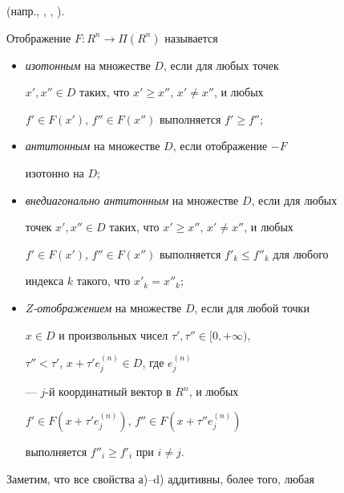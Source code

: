 (напр., \cite{PS82}, \cite{Opo86}, \cite{Isa92}).











\begin{defns} \label{def:1}


Отображение $F: R^n \to \Pi (R^n)$ называется


\begin{itemize}


\item[а)] {\it изотонным} на множестве $D$, если для любых точек


$x',x'' \in D$ таких, что $x' \ge x''$, $x'\neq x''$, и любых


$f' \in F(x')$, $f'' \in F(x'')$ выполняется $f'\ge f''$;


\item[b)] {\it антитонным} на множестве $D$, если отображение $-F$


изотонно на $D$;


\item[с)] {\it внедиагонально антитонным} на множестве $D$, если для любых


точек $x',x'' \in D$ таких, что $x' \ge x''$, $x'\neq x''$, и любых


$f' \in F(x')$, $f'' \in F(x'')$ выполняется $f'_k \le f''_k$ для любого


индекса $k$ такого, что $x'_k=x''_k$;


\item[d)] {\it $Z$-отображением} на множестве $D$, если для любой точки


$x \in D$ и произвольных чисел $\tau', \tau'' \in [0,+\infty)$,


$\tau'' < \tau'$, $x+ \tau'e^{(n)}_{j} \in D$, где $e^{(n)}_j$


--- $j$-й координатный вектор в $R^n$, и любых


$f' \in F(x+\tau'e^{(n)}_j)$, $f'' \in F(x+\tau''e^{(n)}_j)$


выполняется $f''_i \ge f'_i$ при $i \neq j$.


\end{itemize}


\end{defns}





Заметим, что все свойства а)--d) аддитивны, более того, любая


